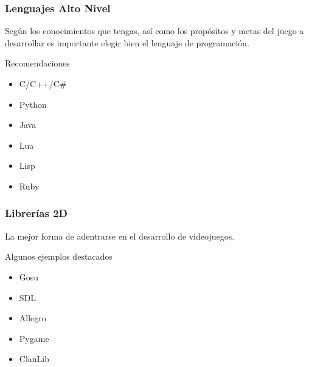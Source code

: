 
\begin{frame}
	\frametitle{Lenguajes Alto Nivel}
	
	Según los conocimientos que tengas, así como los propósitos y metas del juego a desarrollar es importante elegir bien el lenguaje de programación.
		
	\begin{block}{Recomendaciones}
		\begin{itemize}
			\item C/C++/C\#
			\item Python
			\item Java
			\item Lua
			\item Lisp
			\item Ruby
		\end{itemize}
	\end{block}

\end{frame}


\begin{frame}
	\frametitle{Librerías 2D}
		
	La mejor forma de adentrarse en el desarrollo de videojuegos.

	\begin{block}{Algunos ejemplos destacados}
		\begin{itemize}
			\item Gosu
			\item SDL
			\item Allegro
			\item Pygame
			\item ClanLib
		\end{itemize}
	\end{block}

\end{frame}



